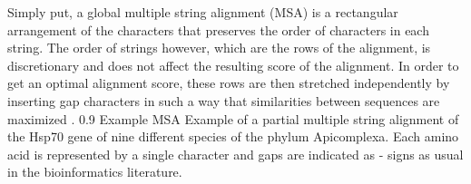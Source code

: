\documentclass[a4paper,10pt]{thesis}
\begin{document}
{{{      Simply put, a global multiple string alignment (MSA) is a rectangular arrangement of the characters that preserves the order of characters in each string. The order of strings however, which are the rows of the alignment, is discretionary and does not affect the resulting score of the alignment. In order to get an optimal alignment score, these rows are then stretched independently by inserting gap characters in such a way that similarities between sequences are maximized .
      {0.9\columnwidth}
      {Example MSA}
      {Example of a partial multiple string alignment of the Hsp70 gene of nine different species of the phylum Apicomplexa. Each amino acid is represented by a single character and gaps are indicated as - signs as usual in the bioinformatics literature.}%
}}}
\end{document}
